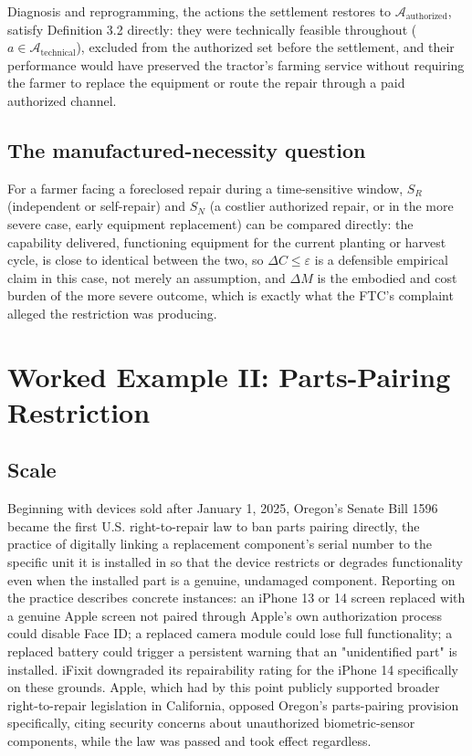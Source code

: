 \documentclass[11pt]{article}
\begin{document}
Diagnosis and reprogramming, the actions the settlement restores to $\mathcal{A}_{\text{authorized}}$, satisfy Definition 3.2 directly: they were technically feasible throughout ($a \in \mathcal{A}_{\text{technical}}$), excluded from the authorized set before the settlement, and their performance would have preserved the tractor's farming service without requiring the farmer to replace the equipment or route the repair through a paid authorized channel.

\subsection{The manufactured-necessity question}

For a farmer facing a foreclosed repair during a time-sensitive window, $S_R$ (independent or self-repair) and $S_N$ (a costlier authorized repair, or in the more severe case, early equipment replacement) can be compared directly: the capability delivered, functioning equipment for the current planting or harvest cycle, is close to identical between the two, so $\Delta C \leq \varepsilon$ is a defensible empirical claim in this case, not merely an assumption, and $\Delta M$ is the embodied and cost burden of the more severe outcome, which is exactly what the FTC's complaint alleged the restriction was producing.

\section{Worked Example II: Parts-Pairing Restriction}

\subsection{Scale}

Beginning with devices sold after January 1, 2025, Oregon's Senate Bill 1596 became the first U.S. right-to-repair law to ban parts pairing directly, the practice of digitally linking a replacement component's serial number to the specific unit it is installed in so that the device restricts or degrades functionality even when the installed part is a genuine, undamaged component. Reporting on the practice describes concrete instances: an iPhone 13 or 14 screen replaced with a genuine Apple screen not paired through Apple's own authorization process could disable Face ID; a replaced camera module could lose full functionality; a replaced battery could trigger a persistent warning that an "unidentified part" is installed. iFixit downgraded its repairability rating for the iPhone 14 specifically on these grounds. Apple, which had by this point publicly supported broader right-to-repair legislation in California, opposed Oregon's parts-pairing provision specifically, citing security concerns about unauthorized biometric-sensor components, while the law was passed and took effect regardless.
\end{document}
